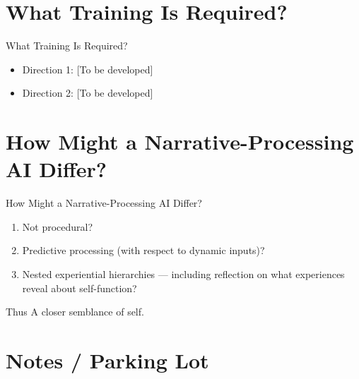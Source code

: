 \documentclass[aspectratio=169]{beamer}
\begin{document}
\section{What Training Is Required?}

\begin{frame}{What Training Is Required?}
  \begin{itemize}
    \item Direction 1: [To be developed]
    \item Direction 2: [To be developed]
  \end{itemize}
\end{frame}

\section{How Might a Narrative-Processing AI Differ?}

\begin{frame}{How Might a Narrative-Processing AI Differ?}
  \begin{enumerate}
    \item<1-> Not procedural?
    \item<2-> Predictive processing (with respect to dynamic inputs)?
    \item<3-> Nested experiential hierarchies --- including reflection on what experiences reveal about self-function?
  \end{enumerate}

  \pause
  \vspace{1em}
  \begin{block}{Thus}
    \alert{A closer semblance of self.}
  \end{block}
\end{frame}

\section{Notes / Parking Lot}
\end{document}
